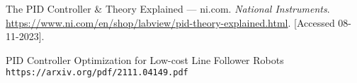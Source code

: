 \begin{thebibliography}{9}
    The {P}{I}{D} {C}ontroller \& {T}heory {E}xplained --- ni.com.
    \textit{National Instruments}.
    \url{https://www.ni.com/en/shop/labview/pid-theory-explained.html}.
    [Accessed 08-11-2023].

    PID Controller Optimization for Low-cost Line
Follower Robots
    \\\texttt{https://arxiv.org/pdf/2111.04149.pdf}
\end{thebibliography}
